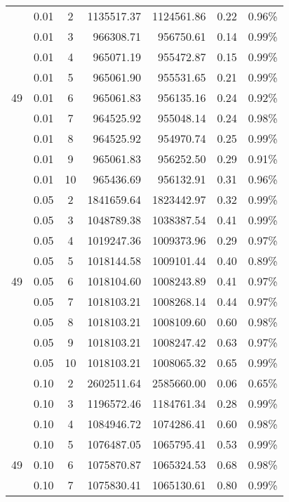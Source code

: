 {\begin{longtable}{cccrrcc}
	\hline
	\endlastfoot
        & 0.01  & 2     & 1135517.37 & 1124561.86 & 0.22  & 0.96\% \\
        & 0.01  & 3     & 966308.71 & 956750.61 & 0.14  & 0.99\% \\
        & 0.01  & 4     & 965071.19 & 955472.87 & 0.15  & 0.99\% \\
        & 0.01  & 5     & 965061.90 & 955531.65 & 0.21  & 0.99\% \\
  49    & 0.01  & 6     & 965061.83 & 956135.16 & 0.24  & 0.92\% \\
        & 0.01  & 7     & 964525.92 & 955048.14 & 0.24  & 0.98\% \\
        & 0.01  & 8     & 964525.92 & 954970.74 & 0.25  & 0.99\% \\
        & 0.01  & 9     & 965061.83 & 956252.50 & 0.29  & 0.91\% \\
        & 0.01  & 10    & 965436.69 & 956132.91 & 0.31  & 0.96\% \\
        & 0.05  & 2     & 1841659.64 & 1823442.97 & 0.32  & 0.99\% \\
        & 0.05  & 3     & 1048789.38 & 1038387.54 & 0.41  & 0.99\% \\
        & 0.05  & 4     & 1019247.36 & 1009373.96 & 0.29  & 0.97\% \\
        & 0.05  & 5     & 1018144.58 & 1009101.44 & 0.40  & 0.89\% \\
  49    & 0.05  & 6     & 1018104.60 & 1008243.89 & 0.41  & 0.97\% \\
        & 0.05  & 7     & 1018103.21 & 1008268.14 & 0.44  & 0.97\% \\
        & 0.05  & 8     & 1018103.21 & 1008109.60 & 0.60  & 0.98\% \\
        & 0.05  & 9     & 1018103.21 & 1008247.42 & 0.63  & 0.97\% \\
        & 0.05  & 10    & 1018103.21 & 1008065.32 & 0.65  & 0.99\% \\
        & 0.10  & 2     & 2602511.64 & 2585660.00 & 0.06  & 0.65\% \\
        & 0.10  & 3     & 1196572.46 & 1184761.34 & 0.28  & 0.99\% \\
        & 0.10  & 4     & 1084946.72 & 1074286.41 & 0.60  & 0.98\% \\
        & 0.10  & 5     & 1076487.05 & 1065795.41 & 0.53  & 0.99\% \\
  49    & 0.10  & 6     & 1075870.87 & 1065324.53 & 0.68  & 0.98\% \\
        & 0.10  & 7     & 1075830.41 & 1065130.61 & 0.80  & 0.99\% \\

\end{longtable}}
